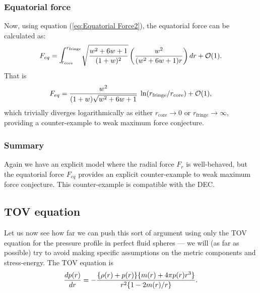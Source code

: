 \documentclass[12pt]{article}
\begin{document}
\subsubsection{Equatorial force}
Now, using equation (\ref{eq:Equatorial Force2}), the equatorial force can be calculated as:
%
\begin{equation}
    F_{eq} =\hbox{\Large $\displaystyle\int$}^{r_\mathrm{fringe}}_{\!\!\!\!\!r_\mathrm{core}}\sqrt{\frac{w^2 + 6w + 1}{(1+w)^2}}\left(\frac{w^2}{(w^2 + 6w + 1)r}\right) dr + {\mathcal{O}}(1).
\end{equation}
That is
\begin{equation}
    F_{eq} =\frac{w^2}{(1+w)\sqrt{w^2 + 6w + 1}}\;
    \ln(r_\mathrm{fringe}/r_\mathrm{core}) +{\mathcal{O}}(1),
\end{equation}
%
which trivially diverges logarithmically as either $r_\mathrm{core}\to0$ or $r_\mathrm{fringe}\to\infty$,
providing a  counter-example to weak maximum force conjecture.

\subsubsection{Summary}

Again we have an explicit model where the radial force $F_r$ is well-behaved, but the equatorial force $F_{eq}$ provides an explicit counter-example to weak maximum force conjecture.
This counter-example is compatible with the DEC.

\subsection{TOV equation}
Let us now see how far we can push this sort of argument using only the TOV equation for the pressure profile in perfect fluid spheres --- we will (as far as possible) try to avoid making specific assumptions on the metric components and stress-energy. The TOV equation is
\begin{equation}
{dp(r)\over dr} = - {\{\rho(r)+p(r)\}\{m(r)+4\pi p(r) r^3\}\over r^2\{1-2m(r)/r\}}.
\end{equation}

\end{document}

